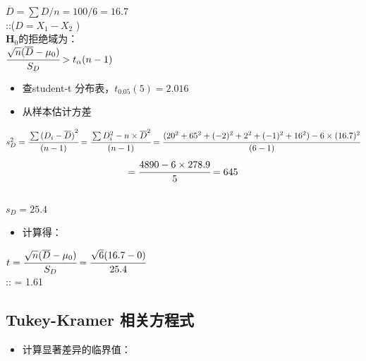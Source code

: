 \(\overline{D} = \sum D / n = 100/6 = 16.7\)\\
::(\(D = X_1 - X_2\) )\\
\(\mathbf{H}_0\)的拒绝域为：\\
\(\cfrac{ \sqrt{n}(\overline{D} - \mu _0) }{S_D}  > t_\alpha(n-1)\)\\

\begin{itemize}
\tightlist
\item
  查student-t 分布表，\(t_{0.05} (5) = 2.016\)
\item
  从样本估计方差\\
\end{itemize}

\(s_D^2 = \cfrac{\sum {(D_i - \overline{D})}^2  }{(n - 1)}= \cfrac{\sum D_i^2 - n \times \overline{D}^2  }{(n - 1)} = \cfrac{(20^2 + 65^2 + (-2)^2 + 2^2 + (-1)^2 + 16^2) - 6 \times (16.7)^2  }{(6 - 1)}\)\\
\[= \cfrac{4890 - 6 \times 278.9  }{5} = 645\]\\
\(s_D = 25.4\)\\

\begin{itemize}
\tightlist
\item
  计算得：
\end{itemize}

\(t = \cfrac{ \sqrt{n}(\overline{D} - \mu _0) }{S_D} = \cfrac{ \sqrt{6}(16.7 - 0) }{25.4}\)\\
:: = 1.61\\

\hypertarget{tukey-kramer-ux76f8ux5173ux65b9ux7a0bux5f0f}{%
\subsection{Tukey-Kramer
相关方程式}\label{tukey-kramer-ux76f8ux5173ux65b9ux7a0bux5f0f}}

\begin{itemize}
\tightlist
\item
  计算显著差异的临界值：
\end{itemize}

